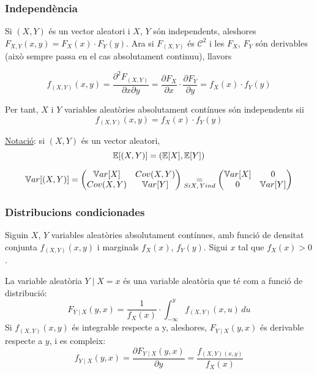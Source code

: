 \subsubsection{Independència}

Si $(X,Y)$ és un vector aleatori i $X$, $Y$ són independents, aleshores $F_{X,Y}(x,y) = F_{X}(x)\cdot F_{Y}(y)$. Ara si $F_{(X,Y)}$ és $\mathcal{C}^{2}$ i les $F_{X}$, $F_{Y}$ són derivables (això sempre passa en el cas absolutament continuu), llavors

\[
  f_{(X,Y)}(x,y) = \frac{\partial^{2}F_{(X,Y)}}{\partial x \partial y} = \frac{\partial F_{X}}{\partial x}\cdot \frac{\partial F_{Y}}{\partial y} = f_{X}(x) \cdot f_{Y}(y)
\]

Per tant, $X$ i $Y$ variables aleatòries absolutament contínues són independents sii
\[
  f_{(X,Y)}(x,y) = f_{X}(x)\cdot f_{Y}(y)
\]

\underline{Notació}: si $(X,Y)$ és un vector aleatori, 
\[
  \mathbb{E}[(X,Y)] = (\mathbb{E}[X], \mathbb{E}[Y])
\]

\[
  \mathbb{V} ar[(X,Y)] = 
  \begin{pmatrix}
    \mathbb{V} ar[X]  &  Cov(X,Y) \\
    Cov(X,Y)  &  \mathbb{V} ar[Y]
  \end{pmatrix}
  \underset{Si X,\, Y ind}{=}
  \begin{pmatrix}
    \mathbb{V} ar[X]  &  0 \\
    0         &  \mathbb{V} ar[Y]
  \end{pmatrix}
\]

\subsubsection{Distribucions condicionades}

Siguin $X$, $Y$ variables aleatòries absolutament contínues, amb funció de densitat conjunta $f_{(X,Y)}(x,y)$ i marginals $f_{X}(x)$, $f_{Y}(y)$. Sigui $x$ tal que $f_{X}(x) > 0$.

\begin{defi}
  La variable aleatòria $Y \mid X = x$ és una variable aleatòria que té com a funció de distribució:
  \[
    F_{Y\mid X}(y,x) = \frac{1}{f_{X}(x)} \cdot \int_{-\infty}^{y}f_{(X,Y)}(x,u) \, du
  \]
  Si $f_{(X,Y)}(x,y)$ és integrable respecte a y, aleshores, $F_{Y \mid X}(y,x)$ és derivable respecte a $y$, i es compleix:
  \[
    f_{Y\mid X}(y,x) = \frac{\partial F_{Y\mid X}(y,x)}{\partial y} = \frac{f_{(X,Y)(x,y)}}{f_{X}(x)}
  \]
\end{defi}

